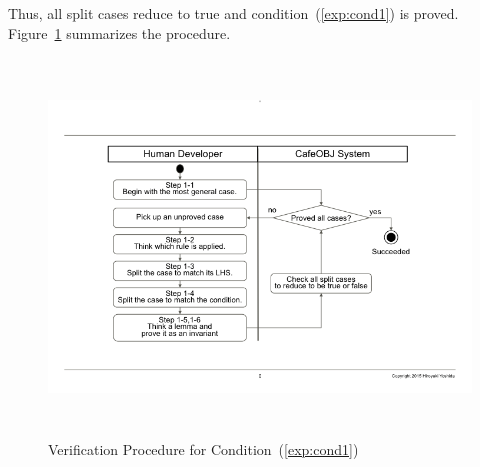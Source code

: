 \documentclass[12pt]{report}
\begin{document}
Thus, all split cases reduce to true and condition~(\ref{exp:cond1}) is proved.
Figure~\ref{fig:procedure} summarizes the procedure.
\begin{figure}
\centering
\includegraphics[height=10cm,natwidth=720,natheight=498,clip,trim=100 80 100 70]{procedure.png}
\caption{Verification Procedure for Condition~(\ref{exp:cond1})}
\label{fig:procedure}
\end{figure}
\end{document}
